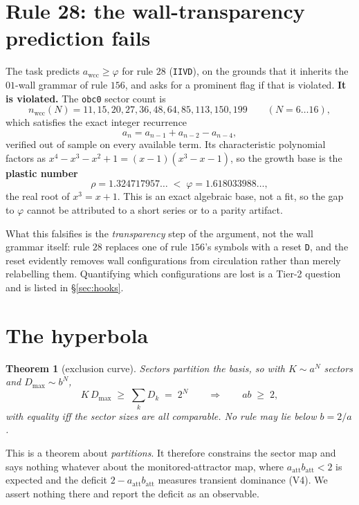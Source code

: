 \documentclass[11pt]{article}
\newcommand{\rt}[1]{\texttt{#1}}
\newcommand{\wcc}{\mathrm{wcc}}
\newcommand{\att}{\mathrm{att}}
\theoremstyle{plain}
\newtheorem{theorem}{Theorem}
\theoremstyle{definition}
\begin{document}
\section{Rule 28: the wall-transparency prediction fails}
\label{sec:r28}

The task predicts $a_\wcc\ge\varphi$ for rule $28$ (\rt{IIVD}), on the grounds
that it inherits the $01$-wall grammar of rule $156$, and asks for a prominent
flag if that is violated. \textbf{It is violated.} The \rt{obc0} sector count is
\[
n_\wcc(N)=11,15,20,27,36,48,64,85,113,150,199 \qquad (N=6\ldots16),
\]
which satisfies the exact integer recurrence
\begin{equation}
a_n=a_{n-1}+a_{n-2}-a_{n-4},
\label{eq:r28}
\end{equation}
verified out of sample on every available term. Its characteristic polynomial
factors as $x^4-x^3-x^2+1=(x-1)(x^3-x-1)$, so the growth base is the
\textbf{plastic number}
\[
\rho=1.324717957\ldots\;<\;\varphi=1.618033988\ldots,
\]
the real root of $x^3=x+1$. This is an exact algebraic base, not a fit, so the
gap to $\varphi$ cannot be attributed to a short series or to a parity artifact.

What this falsifies is the \emph{transparency} step of the argument, not the
wall grammar itself: rule $28$ replaces one of rule $156$'s symbols with a reset
\rt{D}, and the reset evidently removes wall configurations from circulation
rather than merely relabelling them. Quantifying which configurations are lost
is a Tier-2 question and is listed in \S\ref{sec:hooks}.

\section{The hyperbola}
\label{sec:hyper}

\begin{theorem}[exclusion curve]
Sectors partition the basis, so with $K\sim a^N$ sectors and $D_{\max}\sim b^N$,
\begin{equation}
K\,D_{\max}\;\ge\;\sum_k D_k\;=\;2^N
\qquad\Longrightarrow\qquad
ab\;\ge\;2,
\label{eq:hyper}
\end{equation}
with equality iff the sector sizes are all comparable. No rule may lie below
$b=2/a$.
\end{theorem}

\noindent This is a theorem about \emph{partitions}. It therefore constrains the
sector map and says nothing whatever about the monitored-attractor map, where
$a_\att b_\att<2$ is expected and the deficit $2-a_\att b_\att$ measures
transient dominance (V4). We assert nothing there and report the deficit as an
observable.
\end{document}

